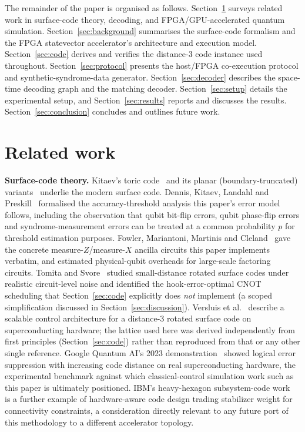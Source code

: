 \documentclass[pdflatex,sn-mathphys,Numbered]{sn-jnl}
\begin{document}
The remainder of the paper is organised as follows. Section~\ref{sec:related} surveys related work in surface-code theory, decoding, and FPGA/GPU-accelerated quantum simulation. Section~\ref{sec:background} summarises the surface-code formalism and the FPGA statevector accelerator's architecture and execution model. Section~\ref{sec:code} derives and verifies the distance-3 code instance used throughout. Section~\ref{sec:protocol} presents the host/FPGA co-execution protocol and synthetic-syndrome-data generator. Section~\ref{sec:decoder} describes the space-time decoding graph and the matching decoder. Section~\ref{sec:setup} details the experimental setup, and Section~\ref{sec:results} reports and discusses the results. Section~\ref{sec:conclusion} concludes and outlines future work.

\section{Related work}\label{sec:related}

\textbf{Surface-code theory.} Kitaev's toric code~\cite{kitaev2003} and its planar (boundary-truncated) variants~\cite{bravyikitaev1998} underlie the modern surface code. Dennis, Kitaev, Landahl and Preskill~\cite{dennis2002} formalised the accuracy-threshold analysis this paper's error model follows, including the observation that qubit bit-flip errors, qubit phase-flip errors and syndrome-measurement errors can be treated at a common probability $p$ for threshold estimation purposes. Fowler, Mariantoni, Martinis and Cleland~\cite{fowler2012} gave the concrete measure-$Z$/measure-$X$ ancilla circuits this paper implements verbatim, and estimated physical-qubit overheads for large-scale factoring circuits. Tomita and Svore~\cite{tomita2014} studied small-distance rotated surface codes under realistic circuit-level noise and identified the hook-error-optimal CNOT scheduling that Section~\ref{sec:code} explicitly does \emph{not} implement (a scoped simplification discussed in Section~\ref{sec:discussion}). Versluis et al.~\cite{versluis2017} describe a scalable control architecture for a distance-3 rotated surface code on superconducting hardware; the lattice used here was derived independently from first principles (Section~\ref{sec:code}) rather than reproduced from that or any other single reference. Google Quantum AI's 2023 demonstration~\cite{acharya2023} showed logical error suppression with increasing code distance on real superconducting hardware, the experimental benchmark against which classical-control simulation work such as this paper is ultimately positioned. IBM's heavy-hexagon subsystem-code work~\cite{chamberland2020} is a further example of hardware-aware code design trading stabilizer weight for connectivity constraints, a consideration directly relevant to any future port of this methodology to a different accelerator topology.
\end{document}
